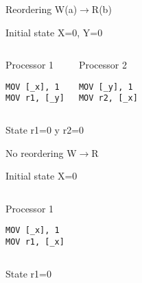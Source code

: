 \begin{frame}[t,fragile]{Reordering W(a)$\rightarrow$R(b)}

\begin{block}{Initial state}
X=0, Y=0
\end{block}


\begin{columns}[T]


\begin{block}{Processor 1}
\begin{lstlisting}[language={[x86masm]Assembler}]
MOV [_x], 1
MOV r1, [_y]
\end{lstlisting}
\end{block}

\begin{block}{Processor 2}
\begin{lstlisting}[language={[x86masm]Assembler}]
MOV [_y], 1
MOV r2, [_x]
\end{lstlisting}
\end{block}

\end{columns}


\begin{block}{State }
r1=0 y r2=0
\end{block}

\end{frame}



\begin{frame}[t,fragile]{No reordering W$\rightarrow$R}

\begin{block}{Initial state}
X=0
\end{block}


\begin{columns}[T]


\begin{block}{Processor 1}
\begin{lstlisting}[language={[x86masm]Assembler}]
MOV [_x], 1
MOV r1, [_x]
\end{lstlisting}
\end{block}


\end{columns}


\begin{block}{State }
r1=0
\end{block}

\end{frame}



